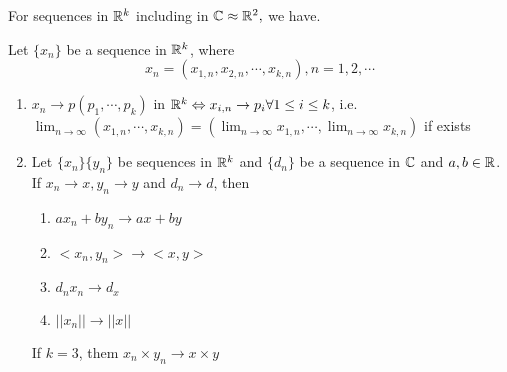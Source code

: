 For sequences in $\mathbb{R}^k$ including in $\mathbb{C} \approx \mathbb{R}^2 ,$ we have.

\begin{thm}
	Let $\{x_n\}$ be a sequence in $\mathbb{R}^k$, where
	$$x_n = (x_{1,n},x_{2,n},\cdots,x_{k,n}), n = 1,2, \cdots$$
	
	\begin{enumerate}[wide,label = $(\alph*)$]
		\item $x_n \rightarrow p (p_1,\cdots , p_k)$ in $\mathbb{R}^k \Leftrightarrow x_{i,n} \rightarrow p_i \forall 1 \leq i \leq k$, i.e. $\lim_{n \rightarrow \infty}(x_{1,n},\cdots,x_{k,n}) = (\lim_{n \rightarrow \infty}x_{1,n},\cdots,\lim_{n \rightarrow \infty}x_{k,n})$ if exists
		\item Let $\{x_n\} \{y_n\}$ be sequences in $\mathbb{R}^k$ and $\{d_n\}$ be a sequence in $\mathbb{C}$ and $a,b \in \mathbb{R}$. If $x_n \rightarrow x,y_n \rightarrow y $ and $d_n \rightarrow d$, then
		
		\begin{enumerate}[label = $\bullet$]
			\item $ax_n + by_n \rightarrow ax + by$
			\item $<x_n,y_n> \rightarrow <x,y>$
			\item $d_n x_n \rightarrow d_x$
			\item $||x_n|| \rightarrow ||x||$
		\end{enumerate}
		
		If $k = 3$, them $x_n \times y_n \rightarrow x \times y$
	\end{enumerate}
\end{thm}

